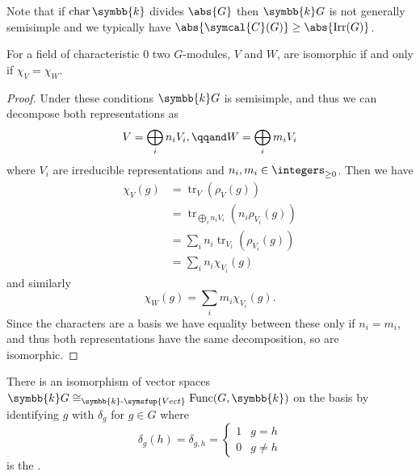 \documentclass[fleqn]{NotesClass}
\makeatletter
\renewcommand{\field}{\symbb{k}}
\newcommand{\c@egory}[1]{\symsfup{#1}}
\newcommand{\Vect}[1][\field]{#1\text{-}\c@egory{Vect}}
\newcommand{\isomorphic}{\cong}
\DeclareMathOperator{\Irr}{Irr}
\DeclareMathOperator{\tr}{tr}
\DeclareMathOperator{\Char}{char}
\newcommand{\conjugacyClasses}{\symcal{C}}
\DeclareMathOperator{\Func}{Func}
\makeatother
\begin{document}
    Note that if \(\Char \field\) divides \(\abs{G}\) then \(\field G\) is not generally semisimple and we typically have \(\abs{\conjugacyClasses(G)} \ge \abs{\Irr(G)}\).
    
    \begin{crl}{}{}
        For a field of characteristic \(0\) two \(G\)-modules, \(V\) and \(W\), are isomorphic if and only if \(\chi_V = \chi_W\).
        \begin{proof}
            Under these conditions \(\field G\) is semisimple, and thus we can decompose both representations as
            \begin{equation}
                V = \bigoplus_i n_i V_i, \qqand W = \bigoplus_i m_i V_i
            \end{equation}
            where \(V_i\) are irreducible representations and \(n_i, m_i \in \integers_{\ge 0}\).
            Then we have
            \begin{align}
                \chi_V(g) &= \tr_V(\rho_V(g))\\
                &= \tr_{\bigoplus_i n_i V_i}(n_i\rho_{V_i}(g))\\
                &= \sum_{i} n_i \tr_{V_i}(\rho_{V_i}(g))\\
                &= \sum_i n_i \chi_{V_i}(g)
            \end{align}
            and similarly
            \begin{equation}
                \chi_W(g) = \sum_i m_i \chi_{V_i}(g).
            \end{equation}
            Since the characters are a basis we have equality between these only if \(n_i = m_i\), and thus both representations have the same decomposition, so are isomorphic.
        \end{proof}
    \end{crl}
    
    There is an isomorphism of vector spaces \(\field G \isomorphic_{\Vect} \Func(G, \field)\) on the basis by identifying \(g\) with \(\delta_g\) for \(g \in G\) where
    \begin{equation}
        \delta_g(h) = \delta_{g,h} = 
        \begin{cases}
            1 & g = h\\
            0 & g \ne h
        \end{cases}
    \end{equation}
    is the .
    
\end{document}
